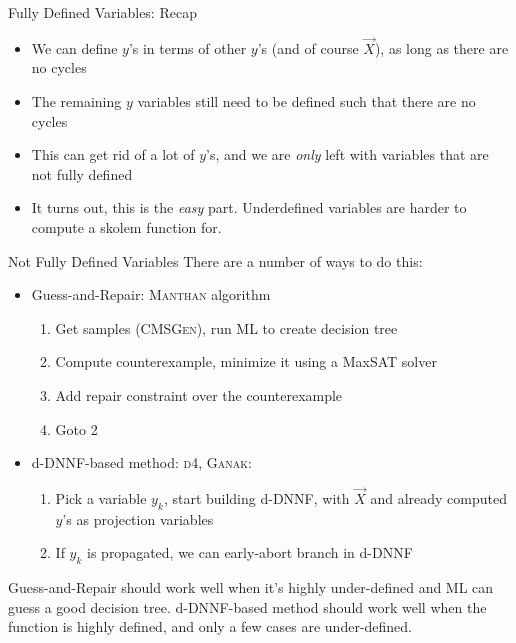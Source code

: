 \documentclass[aspectratio=169]{beamer}
\begin{document}
\begin{frame}{Fully Defined Variables: Recap}
\begin{itemize}
    \item We can define $y$'s in terms of other $y$'s (and of course
        $\vec{X}$), as long as there are no cycles
    \item The remaining $y$ variables still need to be defined
        such that there are no cycles
    \item This can get rid of a lot of $y$'s, and we are \emph{only} left
        with variables that are not fully defined
    \item It turns out, this is the \emph{easy} part. Underdefined
        variables are harder to compute a skolem function for.
\end{itemize}
\end{frame}

\begin{frame}{Not Fully Defined Variables}
There are a number of ways to do this:
\begin{itemize}
    \item Guess-and-Repair: \textsc{Manthan} algorithm
        \begin{enumerate}
            \item Get samples (\textsc{CMSGen}), run ML to create decision tree
            \item Compute counterexample, minimize it using a MaxSAT solver
            \item Add repair constraint over the counterexample
            \item Goto 2
        \end{enumerate}
    \item d-DNNF-based method: \textsc{d4}, \textsc{Ganak}:
        \begin{enumerate}
            \item Pick a variable $y_k$, start building d-DNNF, with $\vec{X}$ and
                already computed $y$'s as projection variables
            \item If $y_k$ is propagated, we can early-abort branch in d-DNNF
        \end{enumerate}
\end{itemize}
\bigskip

Guess-and-Repair should work well when it's highly under-defined and ML
can guess a good decision tree. d-DNNF-based method should work well when
the function is highly defined, and only a few cases are under-defined.
\end{frame}
\end{document}

